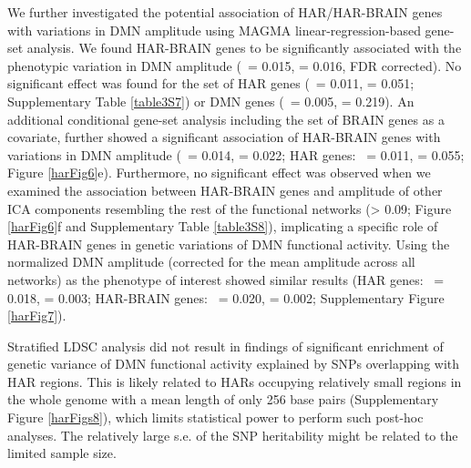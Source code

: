 \begin{refsection}
We further investigated the potential association of HAR/HAR-BRAIN genes with variations in DMN amplitude using MAGMA linear-regression-based gene-set analysis\citep{de2015magma}. We found HAR-BRAIN genes to be significantly associated with the phenotypic variation in DMN amplitude (\textbeta \ = 0.015, \pval  = 0.016, FDR corrected). No significant effect was found for the set of HAR genes (\textbeta \ = 0.011, \pval = 0.051; Supplementary Table \ref{table3S7}) or DMN genes (\textbeta \ = 0.005, \pval = 0.219). An additional conditional gene-set analysis \citep{de2018conditional} including the set of BRAIN genes as a covariate, further showed a significant association of HAR-BRAIN genes with variations in DMN amplitude (\textbeta \ = 0.014, \pval = 0.022; HAR genes: \textbeta \ = 0.011, \pval = 0.055; Figure \ref{harFig6}e). Furthermore, no significant effect was observed when we examined the association between HAR-BRAIN genes and amplitude of other ICA components resembling the rest of the functional networks (\pval > 0.09; Figure \ref{harFig6}f and Supplementary Table \ref{table3S8}), implicating a specific role of HAR-BRAIN genes in genetic variations of DMN functional activity. Using the normalized DMN amplitude (corrected for the mean amplitude across all networks) as the phenotype of interest showed similar results (HAR genes: \textbeta \ = 0.018, \pval = 0.003; HAR-BRAIN genes: \textbeta \ = 0.020, \pval = 0.002; Supplementary Figure \ref{harFig7}).

Stratified LDSC analysis \citep{finucane2015partitioning} did not result in findings of significant enrichment of genetic variance of DMN functional activity explained by SNPs overlapping with HAR regions. This is likely related to HARs occupying relatively small regions in the whole genome with a mean length of only 256 base pairs (Supplementary Figure \ref{harFigs8}), which limits statistical power to perform such post-hoc analyses. The relatively large s.e. of the SNP heritability might be related to the limited sample size.


\end{refsection}
